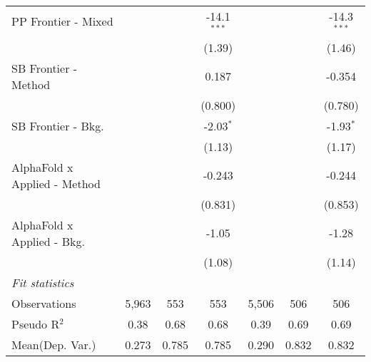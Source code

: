 \begin{tabular}{lcccccc}
   PP Frontier - Mixed          &               &         & -14.1$^{***}$ &               &         & -14.3$^{***}$\\   
                                &               &         & (1.39)        &               &         & (1.46)\\   
   SB Frontier - Method         &               &         & 0.187         &               &         & -0.354\\   
                                &               &         & (0.800)       &               &         & (0.780)\\   
   SB Frontier - Bkg.           &               &         & -2.03$^{*}$   &               &         & -1.93$^{*}$\\   
                                &               &         & (1.13)        &               &         & (1.17)\\   
   AlphaFold x Applied - Method &               &         & -0.243        &               &         & -0.244\\   
                                &               &         & (0.831)       &               &         & (0.853)\\   
   AlphaFold x Applied - Bkg.   &               &         & -1.05         &               &         & -1.28\\   
                                &               &         & (1.08)        &               &         & (1.14)\\   
   \midrule
   \emph{Fit statistics}\\
   Observations                 & 5,963         & 553     & 553           & 5,506         & 506     & 506\\  
   Pseudo R$^2$                 & 0.38          & 0.68    & 0.68          & 0.39          & 0.69    & 0.69\\  
Mean(Dep. Var.) & 0.273 & 0.785 & 0.785 & 0.290 & 0.832 & 0.832 \\
   

\end{tabular}
